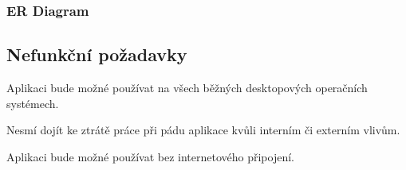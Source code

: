 \subsubsection*{ER Diagram}

\begin{enumfp}[resume]
    \item 
\end{enumfp}

\subsection{Nefunkční požadavky}

\begin{enumnfp}
    \item Aplikaci bude možné používat na všech běžných desktopových operačních systémech.
    \item Nesmí dojít ke ztrátě práce při pádu aplikace kvůli interním či externím vlivům.
    \item Aplikaci bude možné používat bez internetového připojení.
\end{enumnfp}
